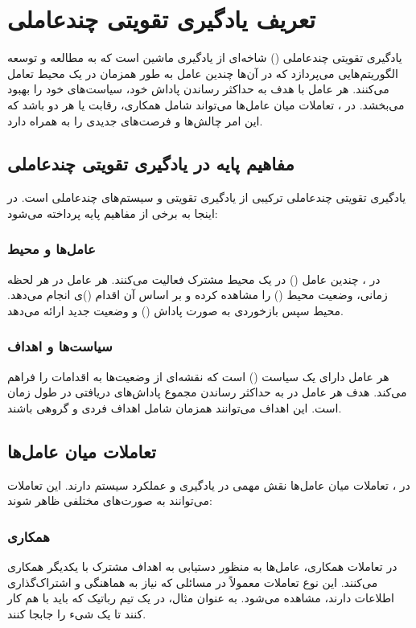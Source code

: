 \section{تعریف یادگیری تقویتی چندعاملی}
یادگیری تقویتی چندعاملی () شاخه‌ای از یادگیری ماشین است که به مطالعه و توسعه الگوریتم‌هایی می‌پردازد که در آن‌ها چندین عامل به طور همزمان در یک محیط تعامل می‌کنند. هر عامل با هدف به حداکثر رساندن پاداش خود، سیاست‌های خود را بهبود می‌بخشد. در ، تعاملات میان عامل‌ها می‌تواند شامل همکاری، رقابت یا هر دو باشد که این امر چالش‌ها و فرصت‌های جدیدی را به همراه دارد.

\subsection{مفاهیم پایه در یادگیری تقویتی چندعاملی}
یادگیری تقویتی چندعاملی ترکیبی از یادگیری تقویتی و سیستم‌های چندعاملی است. در اینجا به برخی از مفاهیم پایه پرداخته می‌شود:

\subsubsection{عامل‌ها و محیط}
در ، چندین عامل () در یک محیط مشترک فعالیت می‌کنند. هر عامل در هر لحظه زمانی، وضعیت محیط () را مشاهده کرده و بر اساس آن اقدام ()ی انجام می‌دهد. محیط سپس بازخوردی به صورت پاداش () و وضعیت جدید ارائه می‌دهد.

\subsubsection{سیاست‌ها و اهداف}
هر عامل دارای یک سیاست () است که نقشه‌ای از وضعیت‌ها به اقدامات را فراهم می‌کند. هدف هر عامل در  به حداکثر رساندن مجموع پاداش‌های دریافتی در طول زمان است. این اهداف می‌توانند همزمان شامل اهداف فردی و گروهی باشند.

\subsection{تعاملات میان عامل‌ها}
در ، تعاملات میان عامل‌ها نقش مهمی در یادگیری و عملکرد سیستم دارند. این تعاملات می‌توانند به صورت‌های مختلفی ظاهر شوند:

\subsubsection{همکاری}
در تعاملات همکاری، عامل‌ها به منظور دستیابی به اهداف مشترک با یکدیگر همکاری می‌کنند. این نوع تعاملات معمولاً در مسائلی که نیاز به هماهنگی و اشتراک‌گذاری اطلاعات دارند، مشاهده می‌شود. به عنوان مثال، در یک تیم رباتیک که باید با هم کار کنند تا یک شیء را جابجا کنند.

